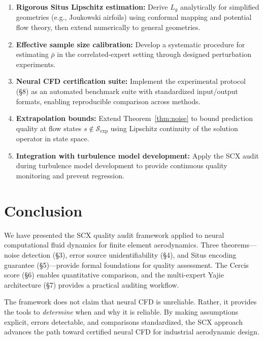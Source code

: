 \documentclass[11pt,a4paper]{article}
\theoremstyle{definition}
\theoremstyle{remark}
\begin{document}
\begin{enumerate}[label=(\roman*)]
    \item \textbf{Rigorous Situs Lipschitz estimation:} Derive $L_g$ analytically for simplified geometries (e.g., Joukowski airfoils) using conformal mapping and potential flow theory, then extend numerically to general geometries.
    \item \textbf{Effective sample size calibration:} Develop a systematic procedure for estimating $\bar{\rho}$ in the correlated-expert setting through designed perturbation experiments.
    \item \textbf{Neural CFD certification suite:} Implement the experimental protocol (§8) as an automated benchmark suite with standardized input/output formats, enabling reproducible comparison across methods.
    \item \textbf{Extrapolation bounds:} Extend Theorem~\ref{thm:noise} to bound prediction quality at flow states $s \notin \mathcal{S}_{\text{exp}}$ using Lipschitz continuity of the solution operator in state space.
    \item \textbf{Integration with turbulence model development:} Apply the SCX audit during turbulence model development to provide continuous quality monitoring and prevent regression.
\end{enumerate}

\section{Conclusion}

We have presented the SCX quality audit framework applied to neural computational fluid dynamics for finite element aerodynamics.
Three theorems---noise detection (§3), error source unidentifiability (§4), and Situs encoding guarantee (§5)---provide formal foundations for quality assessment.
The Cercis score (§6) enables quantitative comparison, and the multi-expert Yajie architecture (§7) provides a practical auditing workflow.

The framework does not claim that neural CFD is unreliable.
Rather, it provides the tools to \emph{determine} when and why it is reliable.
By making assumptions explicit, errors detectable, and comparisons standardized, the SCX approach advances the path toward certified neural CFD for industrial aerodynamic design.
\end{document}
